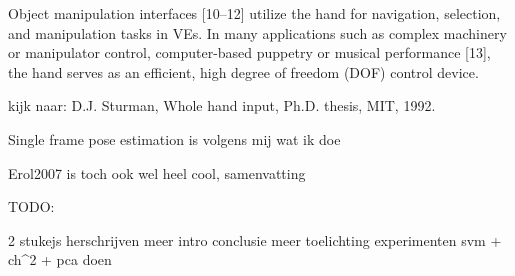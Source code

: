 Object manipulation interfaces [10–12] utilize the hand for navigation, selection, and manipulation tasks in VEs. In many applications such as complex machinery or manipulator control, computer-based puppetry or musical performance [13], the hand serves as an efficient, high degree of freedom (DOF) control device. 

kijk naar: D.J. Sturman, Whole hand input, Ph.D. thesis, MIT, 1992.



Single frame pose estimation is volgens mij wat ik doe



Erol2007 is toch ook wel heel cool, samenvatting


TODO:

2 stukejs herschrijven
meer intro
conclusie
meer toelichting experimenten
svm + ch^2 + pca doen

